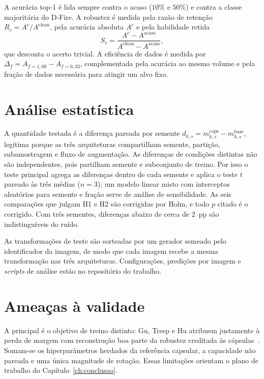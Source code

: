 A acurácia top-1 é lida sempre contra o acaso ($10\%$ e $50\%$) e contra a
classe majoritária do D-Fire. A robustez é medida pela razão de retenção
$R_c = A^{c}/A^{\text{clean}}$, pela acurácia absoluta $A^{c}$ e pela
habilidade retida
\begin{equation}
  S_c = \frac{A^{c} - A^{\text{acaso}}}{A^{\text{clean}} - A^{\text{acaso}}},
  \label{eq:skill}
\end{equation}
que desconta o acerto trivial. A eficiência de dados é medida por
$\Delta_{f} = A_{f=1{,}00} - A_{f=0{,}33}$, complementada pela acurácia ao
mesmo volume e pela fração de dados necessária para atingir um alvo fixo.

\section{Análise estatística}
\label{sec:protocol:stats}
\label{sec:protocol:stats:unit}

A quantidade testada é a diferença pareada por semente
$d_{k,s} = m_{k,s}^{\text{caps}} - m_{k,s}^{\text{base}}$, legítima porque as
três arquiteturas compartilham semente, partição, subamostragem e fluxo de
augmentação. As diferenças de condições distintas não são independentes, pois
partilham semente e subconjunto de treino. Por isso o teste principal agrega as
diferenças dentro de cada semente e aplica o teste $t$ pareado às três médias
($n = 3$); um modelo linear misto com interceptos aleatórios para semente e
fração serve de análise de sensibilidade. As seis comparações que julgam H1 e H2
são corrigidas por Holm, e todo $p$ citado é o corrigido. Com três sementes,
diferenças abaixo de cerca de $2$~pp são indistinguíveis do ruído.

As transformações de teste são sorteadas por um gerador semeado pelo
identificador da imagem, de modo que cada imagem recebe a mesma transformação
nas três arquiteturas. Configurações, predições por imagem e \emph{scripts} de
análise estão no repositório do trabalho.

\section{Ameaças à validade}
\label{sec:protocol:threats}

A principal é o objetivo de treino distinto: Gu, Tresp e Hu atribuem justamente
à perda de margem com reconstrução boa parte da robustez creditada às
cápsulas~\cite{gu2021notrobust}. Somam-se os hiperparâmetros herdados da
referência capsular, a capacidade não pareada e uma única magnitude de rotação.
Essas limitações orientam o plano de trabalho do Capítulo~\ref{ch:conclusao}.